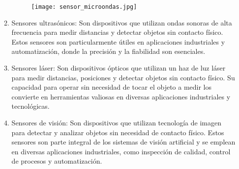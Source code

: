\begin{enumerate}
\begin{enumerate}
\begin{figure}[h]
{					\texttt{[image: sensor\_microondas.jpg]}%
					\label{fig:Funcionamiento del sensor de microondas}
					\cite{SYSCOMBlog}
				}
				\hfill
			\end{figure}
			\item Sensores ultrasónicos: Son dispositivos que utilizan ondas sonoras de alta frecuencia para medir distancias y detectar objetos sin contacto físico. Estos sensores son particularmente útiles en aplicaciones industriales y automatización, donde la precisión y la fiabilidad son esenciales.\cite{ultrason}\\ 
			\begin{figure}[h]
				\centering
				\hfill
			\end{figure}
			\item Sensores láser: Son dispositivos ópticos que utilizan un haz de luz láser para medir distancias, posiciones y detectar objetos sin contacto físico. Su capacidad para operar sin necesidad de tocar el objeto a medir los convierte en herramientas valiosas en diversas aplicaciones industriales y tecnológicas.\cite{Slaser}\\ 
			\begin{figure}[h]
				\centering
				\hfill
			\end{figure}
			\item Sensores de visión: Son dispositivos que utilizan tecnología de imagen para detectar y analizar objetos sin necesidad de contacto físico. Estos sensores son parte integral de los sistemas de visión artificial y se emplean en diversas aplicaciones industriales, como inspección de calidad, control de procesos y automatización.\cite{Svision}\\ 
			\begin{figure}[h]
				\centering
				\hfill
			\end{figure}
		\end{enumerate}
	\end{enumerate}
	

